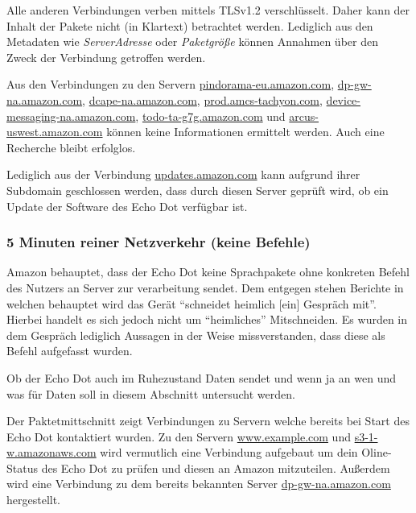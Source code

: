 Alle anderen Verbindungen verben mittels TLSv1.2 verschlüsselt.
Daher kann der Inhalt der Pakete nicht (in Klartext) betrachtet werden.
Lediglich aus den Metadaten wie \textit{Server\-Adresse} oder \textit{Paketgröße} können Annahmen über den Zweck der Verbindung getroffen werden.


Aus den Verbindungen zu den Servern
\url{pindorama-eu.amazon.com},
\url{dp-gw-na.amazon.com},
\url{dcape-na.amazon.com},
\url{prod.amcs-tachyon.com},
\url{device-messaging-na.amazon.com},
\url{todo-ta-g7g.amazon.com} und
\url{arcus-uswest.amazon.com}
können keine Informationen ermittelt werden.
Auch eine Recherche bleibt erfolglos.

Lediglich aus der Verbindung \url{updates.amazon.com} kann aufgrund ihrer Subdomain geschlossen werden,
dass durch diesen Server geprüft wird, ob ein Update der Software des Echo Dot verfügbar ist.


\subsubsection{5 Minuten reiner Netzverkehr (keine Befehle)}
Amazon behauptet, dass der Echo Dot keine Sprachpakete ohne konkreten Befehl des Nutzers an Server zur verarbeitung sendet.
Dem entgegen stehen Berichte in welchen behauptet wird das Gerät \enquote{schneidet heimlich [ein] Gespräch mit}\cite{AmazonEc81:online}.
Hierbei handelt es sich jedoch nicht um \enquote{heimliches} Mitschneiden. Es wurden in dem Gespräch lediglich Aussagen in der Weise missverstanden,
dass diese als Befehl aufgefasst wurden.

Ob der Echo Dot auch im Ruhezustand Daten sendet und wenn ja an wen und was für Daten soll in diesem Abschnitt untersucht werden.

Der Paktetmittschnitt zeigt Verbindungen zu Servern welche bereits bei Start des Echo Dot kontaktiert wurden.
Zu den Servern \url{www.example.com} und \url{s3-1-w.amazonaws.com} wird vermutlich eine Verbindung aufgebaut um dein Oline-Status des Echo Dot zu prüfen und diesen an Amazon mitzuteilen.
Außerdem wird eine Verbindung zu dem bereits bekannten Server \url{dp-gw-na.amazon.com} hergestellt.

